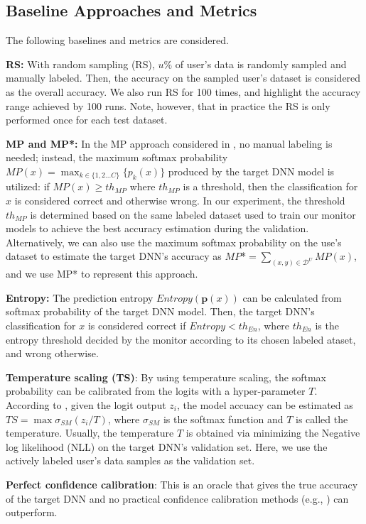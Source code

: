 \documentclass{article}
\begin{document}
\subsection{Baseline Approaches and Metrics}
The following baselines and metrics are considered.

\textbf{RS:} With random sampling (RS), $u\%$ of user's data is  randomly sampled and manually labeled. Then, the accuracy on the sampled user's dataset is considered as the overall accuracy.
We also run RS for 100 times, and highlight the  accuracy range achieved by 100 runs. Note, however, that in practice the RS is only performed {once} for each test dataset.

\textbf{MP and MP*:} In the MP approach considered
in \cite{DNN_Uncertainty_Baseline_OOD_ICLR_2017}, no manual
labeling is needed; instead,
the maximum softmax probability
$MP(x)={\max}_{k\in\{1,2...C\}}\{p_k(x)\}$
produced by the target DNN model
is utilized: if $MP(x)\geq th_{MP}$
where $th_{MP}$ is a threshold, then the classification for $x$ is considered correct and otherwise wrong.
In our experiment, the threshold $th_{MP}$ is determined
based on the same labeled dataset used to train our monitor models
to achieve the best accuracy estimation during the validation.
Alternatively, we can also use the maximum softmax probability
on the use's dataset to estimate the target DNN's accuracy as
$MP$*$=\sum_{(x,y)\in\mathcal{D}^U}MP(x)$, and we use MP* to represent
this approach.

\textbf{Entropy:} The prediction entropy $Entropy(\mathbf{p}(x))$ can be calculated from softmax probability of the target DNN model. Then, the target DNN's classification for $x$ is considered correct if $Entropy<th_{En}$, where $th_{En}$ is the entropy threshold decided by the monitor according
to its chosen labeled ataset, and wrong otherwise.

\textbf{Temperature scaling (TS)}: By using temperature scaling, the softmax probability can be calibrated from the logits  with a hyper-parameter $T$. According to \cite{DNN_Calibration_TemperatureScaling_ICML_2017_calibration_guo_2017}, given the logit output $z_i$, the model accuacy can be estimated as $TS=\max{\sigma_{SM}(z_i/T)}$, where $\sigma_{SM}$ is the softmax function and $T$ is called the temperature. Usually, the temperature $T$ is obtained via minimizing the Negative log likelihood (NLL) on the target
DNN's validation set. Here, we use the actively labeled
user's data samples as the validation set.

\textbf{Perfect confidence calibration}:
This is an oracle that gives the true accuracy of the target
DNN and no practical confidence calibration
methods (e.g., \cite{DNN_Uncertainty_PostHoc_Dirichlet_NIPS_2019_kull2019beyond}) can outperform.
\end{document}

